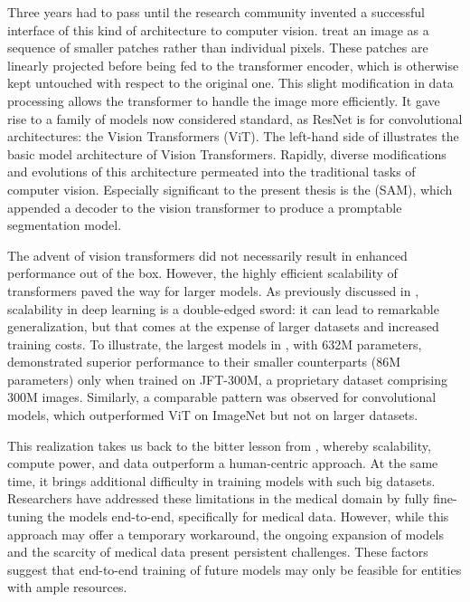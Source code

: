 Three years had to pass until the research community invented a successful interface of this kind of architecture to computer vision.  treat an image as a sequence of smaller patches rather than individual pixels. These patches are linearly projected before being fed to the transformer encoder, which is otherwise kept untouched with respect to the original one. This slight modification in data processing allows the transformer to handle the image more efficiently. It gave rise to a family of models now considered standard, as ResNet is for convolutional architectures: the Vision Transformers (ViT). The left-hand side of  illustrates the basic model architecture of Vision Transformers. Rapidly, diverse modifications and evolutions of this architecture permeated into the traditional tasks of computer vision. Especially significant to the present thesis is the  (SAM), which appended a decoder to the vision transformer to produce a promptable segmentation model. 

The advent of vision transformers did not necessarily result in enhanced performance out of the box. However, the highly efficient scalability of transformers paved the way for larger models. As previously discussed in , scalability in deep learning is a double-edged sword: it can lead to remarkable generalization, but that comes at the expense of larger datasets and increased training costs. To illustrate, the largest models in , with 632M parameters, demonstrated superior performance to their smaller counterparts (86M parameters) only when trained on JFT-300M, a proprietary dataset comprising 300M images. Similarly, a comparable pattern was observed for convolutional models, which outperformed ViT on ImageNet but not on larger datasets.

This realization takes us back to the bitter lesson from , whereby scalability, compute power, and data outperform a human-centric approach. At the same time, it brings additional difficulty in training models with such big datasets. Researchers have addressed these limitations in the medical domain by fully fine-tuning the models end-to-end, specifically for medical data. However, while this approach may offer a temporary workaround, the ongoing expansion of models and the scarcity of medical data present persistent challenges. These factors suggest that end-to-end training of future models may only be feasible for entities with ample resources.

